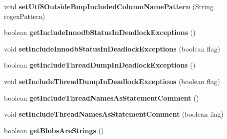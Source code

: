 \begin{DoxyCompactItemize}
void {\bfseries set\+Utf8\+Outside\+Bmp\+Included\+Column\+Name\+Pattern} (String regex\+Pattern)
\item 
\mbox{\label{interfacecom_1_1mysql_1_1jdbc_1_1_connection_properties_a04e9a1d37ce0a655f95646f77f900b7a}} 
boolean {\bfseries get\+Include\+Innodb\+Status\+In\+Deadlock\+Exceptions} ()
\item 
\mbox{\label{interfacecom_1_1mysql_1_1jdbc_1_1_connection_properties_ab9ba78e4eef28ffadc7c0f9b8d963efa}} 
void {\bfseries set\+Include\+Innodb\+Status\+In\+Deadlock\+Exceptions} (boolean flag)
\item 
\mbox{\label{interfacecom_1_1mysql_1_1jdbc_1_1_connection_properties_a9ce8dc89629d5cec4d23659a9d97eb5a}} 
boolean {\bfseries get\+Include\+Thread\+Dump\+In\+Deadlock\+Exceptions} ()
\item 
\mbox{\label{interfacecom_1_1mysql_1_1jdbc_1_1_connection_properties_a5748cad4f44aab82a09748247bfe90e0}} 
void {\bfseries set\+Include\+Thread\+Dump\+In\+Deadlock\+Exceptions} (boolean flag)
\item 
\mbox{\label{interfacecom_1_1mysql_1_1jdbc_1_1_connection_properties_a7a2456dce3cbe48138f96a6a3f691ffa}} 
boolean {\bfseries get\+Include\+Thread\+Names\+As\+Statement\+Comment} ()
\item 
\mbox{\label{interfacecom_1_1mysql_1_1jdbc_1_1_connection_properties_a268993fd6ef540d215d49e32ca44d5b7}} 
void {\bfseries set\+Include\+Thread\+Names\+As\+Statement\+Comment} (boolean flag)
\item 
\mbox{\label{interfacecom_1_1mysql_1_1jdbc_1_1_connection_properties_a016df0c5ff738052328b06109ad4d402}} 
boolean {\bfseries get\+Blobs\+Are\+Strings} ()
\item 
\mbox{\label{interfacecom_1_1mysql_1_1jdbc_1_1_connection_properties_aa5847df87ff5eec3e8953270f1e0e2c1}} 

\end{DoxyCompactItemize}
